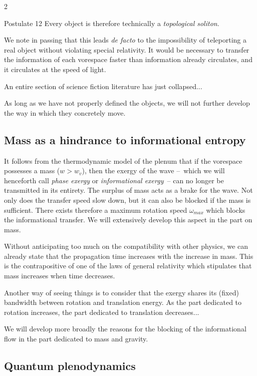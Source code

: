 \begin{multicols}{2}
	\begin{mybox}[breakable,colback=blue!10, colbacktitle=pkcolor]{Postulate 12}
		Every object is therefore technically a \textit{topological soliton}.
	\end{mybox}
	\medskip
	
	We note in passing that this leads \textit{de facto} to the impossibility of 
	teleporting a real object without violating special relativity. It 
	would be necessary to transfer the information of each vorespace faster than 
	information already circulates, and it circulates at the speed of 
	light.
	
	An entire section of science fiction literature has just 
	collapsed...
	
	As long as we have not properly defined the objects, we will not further 
	develop the way in which they concretely move.
	
	\subsection{Mass as a hindrance to informational entropy}
	
	It follows from the thermodynamic model of the plenum that if the vorespace 
	possesses a mass ($w > w_v$), then the exergy of the wave --~which we 
	will henceforth call \textit{phase exergy} or \textit{informational exergy}~-- can 
	no longer be transmitted in its entirety. The surplus of mass acts as 
	a brake for the wave. Not only does the transfer speed slow down, 
	but it can also be blocked if the mass is sufficient. There 
	exists therefore a maximum rotation speed $\omega_{max}$ which blocks the 
	informational transfer. We will extensively develop this aspect in the part on 
	mass.
	
	Without anticipating too much on the compatibility with other physics, we 
	can already state that the propagation time increases with the 
	increase in mass. This is the contrapositive of one of the laws of 
	general relativity which stipulates that mass increases when time 
	decreases.
	
	Another way of seeing things is to consider that the exergy 
	shares its (fixed) bandwidth between rotation and 
	translation energy. As the part dedicated to rotation increases, the part 
	dedicated to translation decreases...
	
	We will develop more broadly the reasons for the blocking of the 
	informational flow in the part dedicated to mass and gravity.
	
	\subsection{Quantum plenodynamics}
	

\end{multicols}
